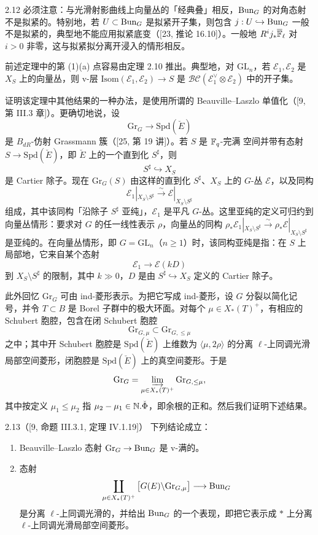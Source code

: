 \begin{rem}{2.12}
必须注意：与光滑射影曲线上向量丛的「经典叠」相反，$\operatorname{Bun}_G$ 的对角态射不是拟紧的。特别地，若 $U\subset\operatorname{Bun}_G$ 是拟紧开子集，则包含 $j:U\hookrightarrow\operatorname{Bun}_G$ 一般不是拟紧的，典型地不能应用拟紧底变（[23, 推论 16.10]）。一般地 $R^ij_*\overline{\mathbb{F}}_\ell$ 对 $i>0$ 非零，这与拟紧拟分离开浸入的情形相反。
\label{rem:a3-2-12}
\end{rem}

前述定理中的第 (1)(a) 点容易由定理 2.10 推出。典型地，对 $\mathrm{GL}_n$，若 $\mathcal E_1,\mathcal E_2$ 是 $X_S$ 上的向量丛，则 v-层 $\mathrm{Isom}(\mathcal E_1,\mathcal E_2)\to S$ 是 $\mathcal{BC}(\mathcal E_1^\vee\otimes\mathcal E_2)$ 中的开子集。

证明该定理中其他结果的一种办法，是使用所谓的 Beauville–Laszlo 单值化（[9, 第 III.3 章]）。更确切地说，设
\[
\mathrm{Gr}_G\longrightarrow\mathrm{Spd}(\breve E)
\]
是 $B_{dR}$-仿射 Grassmann 簇（[25, 第 19 讲]）。若 $S$ 是 $\mathbb{F}_q$-完满 空间并带有态射 $S\to\mathrm{Spd}(\breve E)$，即 $\breve E$ 上的一个直到化 $S^\sharp$，则
\[
S^\sharp\hookrightarrow X_S
\]
是 Cartier 除子。现在 $\mathrm{Gr}_G(S)$ 由这样的直到化 $S^\sharp$、$X_S$ 上的 $G$-丛 $\mathcal E$，以及同构
\[
\mathcal E_1|_{X_S\setminus S^\sharp}\xrightarrow{\ \sim\ }\mathcal E|_{X_S\setminus S^\sharp}
\]
组成，其中该同构「沿除子 $S^\sharp$ 亚纯」，$\mathcal E_1$ 是平凡 $G$-丛。这里亚纯的定义可归约到向量丛情形：要求对 $G$ 的任一线性表示 $\rho$，向量丛的同构 $\rho_*\mathcal E_1|_{X_S\setminus S^\sharp}\xrightarrow{\sim}\rho_*\mathcal E|_{X_S\setminus S^\sharp}$ 是亚纯的。在向量丛情形，即 $G=\mathrm{GL}_n$（$n\ge1$）时，该同构亚纯是指：在 $S$ 上局部地，它来自某个态射
\[
\mathcal E_1\longrightarrow\mathcal E(kD)
\]
到 $X_S\setminus S^\sharp$ 的限制，其中 $k\gg0$，$D$ 是由 $S^\sharp\hookrightarrow X_S$ 定义的 Cartier 除子。

此外回忆 $\mathrm{Gr}_G$ 可由 ind-菱形表示。为把它写成 ind-菱形，设 $G$ 分裂以简化记号，并令 $T\subset B$ 是 Borel 子群中的极大环面。对每个 $\mu\in X_*(T)^+$，有相应的 Schubert 胞腔，包含在闭 Schubert 胞腔
\[
\mathrm{Gr}_{G,\mu}\subset\mathrm{Gr}_{G,\le\mu}
\]
之中；其中开 Schubert 胞腔是 $\mathrm{Spd}(\breve E)$ 上维数为 $\langle\mu,2\rho\rangle$ 的分离 $\ell$-上同调光滑局部空间菱形，闭胞腔是 $\mathrm{Spd}(\breve E)$ 上的真空间菱形。于是
\[
\mathrm{Gr}_G=\varinjlim_{\mu\in X_*(T)^+}\mathrm{Gr}_{G,\le\mu},
\]
其中按定义 $\mu_1\le\mu_2$ 指 $\mu_2-\mu_1\in\mathbb{N}.\check\Phi$，即余根的正和。然后我们证明下述结果。

\begin{thm}{2.13}（[9, 命题 III.3.1, 定理 IV.1.19]）
下列结论成立：
\begin{enumerate}[label=(\arabic*),leftmargin=2.2em,itemsep=0.2em]
\item Beauville–Laszlo 态射 $\mathrm{Gr}_G\to\operatorname{Bun}_G$ 是 v-满的。
\item 态射
\[
\coprod_{\mu\in X_*(T)^+}\big[G(E)\backslash\mathrm{Gr}_{G,\mu}\big]\longrightarrow\operatorname{Bun}_G
\]
是分离 $\ell$-上同调光滑的，并给出 $\operatorname{Bun}_G$ 的一个表现，即把它表示成 $*$ 上分离 $\ell$-上同调光滑局部空间菱形。
\end{enumerate}
\label{thm:a3-2-13}
\end{thm}

